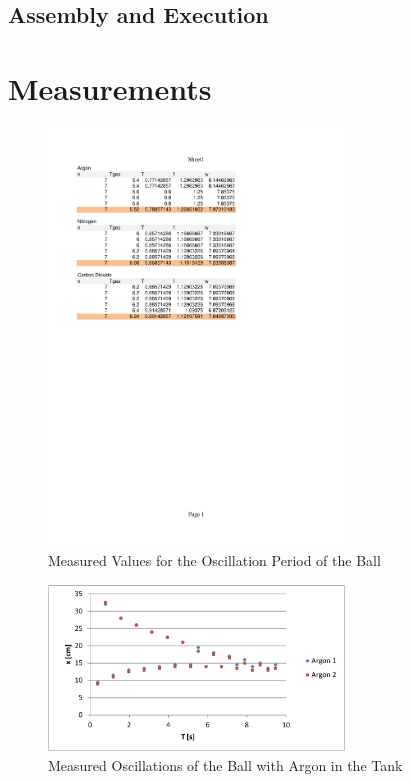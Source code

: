 \documentclass{scrreprt}
\begin{document}
\subsection{Assembly and Execution}

\section{Measurements}
\begin{figure}[H]
	\centering
  \includegraphics[width=0.7\textwidth]{diag/rawvals.pdf}
	\caption{Measured Values for the Oscillation Period of the Ball}
	\label{fig:measurement}
\end{figure}

\begin{figure}[H]
	\centering
  \includegraphics[width=0.7\textwidth]{diag/argon.pdf}
	\caption{Measured Oscillations of the Ball with Argon in the Tank}
	\label{fig:argon}
\end{figure}
\end{document}
